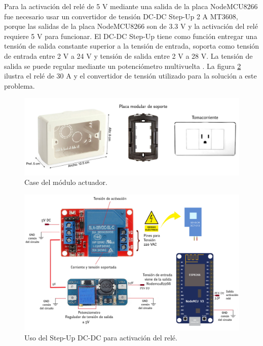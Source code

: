 Para la activación del relé de 5 V mediante una salida de la placa NodeMCU8266 fue necesario usar un convertidor de tensión DC-DC Step-Up 2 A MT3608, porque las salidas de la placa NodeMCU8266 son de 3.3 V y la activación del relé requiere 5 V para funcionar. El DC-DC Step-Up tiene como función entregar una tensión de salida constante superior a la tensión de entrada, soporta como tensión de entrada entre 2 V a 24 V y tensión de salida entre 2 V a 28 V. La tensión de salida se puede regular mediante un potenciómetro multivuelta \citep{WEBSITE:19}. La figura \ref{fig:esquemaactuador} ilustra el relé de 30 A y el convertidor de tensión utilizado para la solución a este problema.

\begin{figure}[htpb]
\centering 
\includegraphics[width=1.0\textwidth]{./Figures/actuador.jpg}
\caption{Case del módulo actuador.}
\label{fig:caseactuador}
\end{figure}


\begin{figure}[htpb]
\centering 
\includegraphics[width=1.0\textwidth]{./Figures/esquemaactuador.png}
\caption{Uso del Step-Up DC-DC para activación del relé. }
\label{fig:esquemaactuador}
\end{figure}

